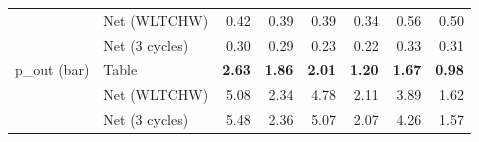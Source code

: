 \begin{table}[t]
\begin{tabular}{llrrrrrr}
 & Net (WLTCHW) & 0.42 & 0.39 & 0.39 & 0.34 & 0.56 & 0.50 \\
 & Net (3 cycles) & 0.30 & 0.29 & 0.23 & 0.22 & 0.33 & 0.31 \\
\addlinespace
p\_out (bar) & Table & \textbf{2.63} & \textbf{1.86} & \textbf{2.01} & \textbf{1.20} & \textbf{1.67} & \textbf{0.98} \\
 & Net (WLTCHW) & 5.08 & 2.34 & 4.78 & 2.11 & 3.89 & 1.62 \\
 & Net (3 cycles) & 5.48 & 2.36 & 5.07 & 2.07 & 4.26 & 1.57 \\
\bottomrule
\end{tabular}
\end{table}

